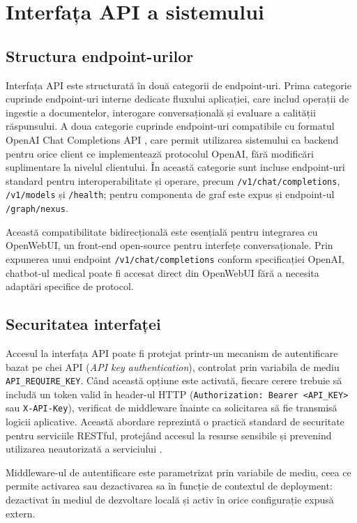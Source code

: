 \documentclass[12pt, a4paper, oneside, romanian]{teza-upb}
\begin{document}
\section{Interfața API a sistemului}

\subsection{Structura endpoint-urilor}

Interfața API este structurată în două categorii de endpoint-uri. Prima categorie cuprinde endpoint-uri interne dedicate fluxului aplicației, care includ operații de ingestie a documentelor, interogare conversațională și evaluare a calității răspunsului. A doua categorie cuprinde endpoint-uri compatibile cu formatul OpenAI Chat Completions API \cite{openai_api}, care permit utilizarea sistemului ca backend pentru orice client ce implementează protocolul OpenAI, fără modificări suplimentare la nivelul clientului. În această categorie sunt incluse endpoint-uri standard pentru interoperabilitate și operare, precum \texttt{/v1/chat/completions}, \texttt{/v1/models} și \texttt{/health}; pentru componenta de graf este expus și endpoint-ul \texttt{/graph/nexus}.

Această compatibilitate bidirecțională este esențială pentru integrarea cu OpenWebUI, un front-end open-source pentru interfețe conversaționale. Prin expunerea unui endpoint \texttt{/v1/chat/completions} conform specificației OpenAI, chatbot-ul medical poate fi accesat direct din OpenWebUI fără a necesita adaptări specifice de protocol.

\subsection{Securitatea interfaței}

Accesul la interfața API poate fi protejat printr-un mecanism de autentificare bazat pe chei API (\textit{API key authentication}), controlat prin variabila de mediu \texttt{API\_REQUIRE\_KEY}. Când această opțiune este activată, fiecare cerere trebuie să includă un token valid în header-ul HTTP (\texttt{Authorization: Bearer <API\_KEY>} sau \texttt{X-API-Key}), verificat de middleware înainte ca solicitarea să fie transmisă logicii aplicative. Această abordare reprezintă o practică standard de securitate pentru serviciile RESTful, protejând accesul la resurse sensibile și prevenind utilizarea neautorizată a serviciului \cite{flask_doc}.

Middleware-ul de autentificare este parametrizat prin variabile de mediu, ceea ce permite activarea sau dezactivarea sa în funcție de contextul de deployment: dezactivat în mediul de dezvoltare locală și activ în orice configurație expusă extern.
\end{document}
